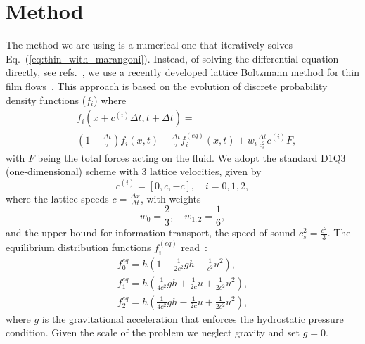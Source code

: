 \documentclass[twocolumn,amsmath,amssymb,showpacs,pre,nofootinbib,superscriptaddress]{revtex4-1} %
\begin{document}
\section{Method}\label{sec:method}
The method we are using is a numerical one that iteratively solves Eq.~(\ref{eq:thin_with_marangoni}).
Instead, of solving the differential equation directly, see refs.~\cite{PhysRevE.63.011208, PhysRevLett.119.204501}, we use a recently developed lattice Boltzmann method for thin film flows~\cite{PhysRevE.100.033313, PhysRevE.104.034801}.
This approach is based on the evolution of discrete probability density functions ($f_i$) where
\begin{equation}\label{eq:LBE}
    \begin{split}
        &f_i(x+c^{(i)}\Delta t,t+\Delta t) = \\
        &\left(1 - \frac{\Delta t}{\tau}\right) f_i(x,t) + \frac{\Delta t}{\tau} f_i^{(eq)}(x,t) + w_i \frac{\Delta t}{c_s^2} c^{(i)} F,
    \end{split}
\end{equation}
with $F$ being the total forces acting on the fluid.
We adopt the standard D1Q3 (one-dimensional) scheme with $3$ lattice velocities, given by
\begin{equation}\label{eq:speeds}
c^{(i)}  = [0, c, -c], \quad i = 0, 1, 2,
\end{equation}
where the lattice speeds $c=\frac{\Delta x}{\Delta t}$, with weights
\begin{equation}
w_0 = \frac{2}{3},\quad w_{1,2} = \frac{1}{6},
\end{equation}
and the upper bound for information transport, the speed of sound $c_s^2=\frac{c^2}{3}$.
The equilibrium distribution functions $f_i^{(eq)}$ read~\cite{VANTHANG20107373}:
\begin{gather}
    f_{0}^{eq} = h\left(1-\frac{1}{2c^2}gh - \frac{1}{c^2}u^2\right),\nonumber\\
    f_{1}^{eq} = h\left(\frac{1}{4c^2}gh + \frac{1}{2c}u + \frac{1}{2c^2}u^2\right)\label{eq:equilibria},\\
    f_{2}^{eq} = h\left(\frac{1}{4c^2}gh - \frac{1}{2c}u + \frac{1}{2c^2}u^2\right),\nonumber
\end{gather}
where $g$ is the gravitational acceleration that enforces the hydrostatic pressure condition. 
Given the scale of the problem we neglect gravity and set $g=0$.
\end{document}
